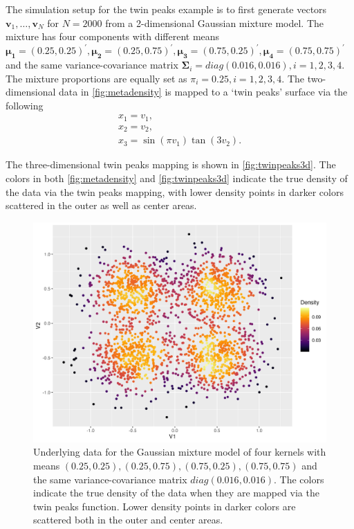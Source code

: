 \documentclass[
]{article}
\begin{document}
The simulation setup for the twin peaks example is to first generate
vectors \(\bm{v}_1,\dots,\bm{v}_N\) for \(N=2000\) from a 2-dimensional
Gaussian mixture model. The mixture has four components with different
means
\(\bm{\mu_1}=(0.25, 0.25)^\prime, \bm{\mu_2}=(0.25, 0.75)^\prime, \bm{\mu_3}=(0.75, 0.25)^\prime, \bm{\mu_4}=(0.75, 0.75)^\prime\)
and the same variance-covariance matrix
\(\bm{\Sigma}_i=diag(0.016, 0.016), i=1,2,3,4\). The mixture proportions
are equally set as \(\pi_i=0.25, i=1,2,3,4\). The two-dimensional data
in \autoref{fig:metadensity} is mapped to a `twin peaks' surface via the
following \begin{equation}
\label{eq:twinpeak}
\begin{array}{lcl}
x_1 = v_1, \\
x_2 = v_2, \\
x_3 = \sin(\pi v_1) \tan (3 v_2).
\end{array}
\end{equation}

The three-dimensional twin peaks mapping is shown in
\autoref{fig:twinpeaks3d}. The colors in both \autoref{fig:metadensity}
and \autoref{fig:twinpeaks3d} indicate the true density of the data via
the twin peaks mapping, with lower density points in darker colors
scattered in the outer as well as center areas.

\begin{figure}

{\centering \includegraphics[width=0.8\linewidth]{figures/truedensity_twinpeaks_dc_labv} 

}

\caption{Underlying data for the Gaussian mixture model of four kernels with means $(0.25, 0.25), (0.25, 0.75), (0.75, 0.25), (0.75, 0.75)$ and the same variance-covariance matrix $diag(0.016, 0.016)$. The colors indicate the true density of the data when they are mapped via the twin peaks function. Lower density points in darker colors are scattered both in the outer and center areas.}\label{fig:metadensity}
\end{figure}
\end{document}
